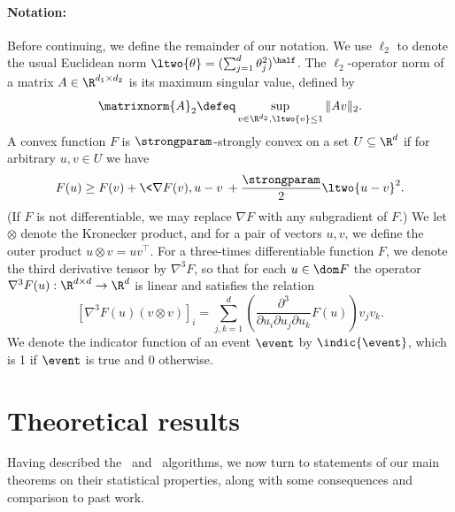 \documentclass[11pt,twoside]{article}
\theoremstyle{definition}
\begin{document}
\paragraph{Notation:}

Before continuing, we define the remainder of our notation. We use
$\ell_2$ to denote the usual Euclidean norm $\ltwo{\theta} =
(\sum_{j=1}^d \theta_j^2)^{\half}$.  The $\ell_2$-operator norm of a
matrix $A \in \R^{d_1 \times d_2}$ is its maximum singular value,
defined by
\begin{equation*}
  \matrixnorm{A}_2 \defeq \sup_{v \in \R^{d_2}, \ltwo{v} \le 1} \|A
  v\|_2.
\end{equation*}
A convex function $F$ is $\strongparam$-strongly convex on a set $U
\subseteq \R^d$ if for arbitrary $u, v \in U$ we have
\begin{equation*}
  F(u) \ge F(v) + \<\nabla F(v), u - v\> + \frac{\strongparam}{2}
  \ltwo{u - v}^2.
\end{equation*}
(If $F$ is not differentiable, we may replace $\nabla F$ with any
subgradient of $F$.) We let $\otimes$ denote the Kronecker product,
and for a pair of vectors $u, v$, we define the outer product $u
\otimes v = u v^\top$. For a three-times differentiable function $F$,
we denote the third derivative tensor by $\nabla^3 F$, so that for
each $u \in \dom F$ the operator $\nabla^3 F(u) : \R^{d \times d}
\rightarrow \R^d$ is linear and satisfies the relation
\begin{equation*}
  \left[\nabla^3 F(u) (v \otimes v)\right]_i = \sum_{j, k = 1}^d
  \left(\frac{\partial^3}{\partial
    u_i \partial u_j \partial u_k} F(u)\right) v_j v_k.
\end{equation*}
We denote the indicator function of an event $\event$ by $\indic{\event}$,
which is 1 if $\event$ is true and 0 otherwise.





\section{Theoretical results}
\label{sec:avg_bound}

Having described the \avgm\ and \savgm\ algorithms, we now turn to
statements of our main theorems on their statistical properties, along
with some consequences and comparison to past work.
\end{document}
